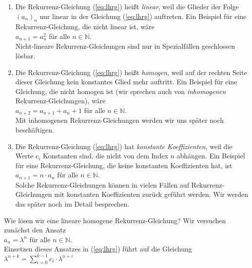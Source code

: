 \begin{enumerate}
\item Die Rekurrenz-Gleichung (\ref{eq:lhrg}) heißt \emph{linear}, weil die Glieder der Folge $(a_n)_n$ nur
      linear in der Gleichung (\ref{eq:lhrg}) auftreten.  Ein Beispiel für eine
      Rekurrenz-Gleichung, die nicht linear ist, wäre \\[0.2cm]
      \hspace*{1.3cm} $a_{n+1} = a_n^2$ \quad für alle $n \in \mathbb{N}$. \\[0.2cm]
      Nicht-lineare Rekurrenz-Gleichungen sind nur in Spezialfällen geschlossen lösbar.
\item Die Rekurrenz-Gleichung (\ref{eq:lhrg}) heißt \emph{homogen}, weil auf der rechten Seite
      dieser Gleichung kein konstantes Glied mehr auftritt.  Ein Beispiel für eine
      Gleichung, die nicht homogen ist (wir sprechen auch von \emph{inhomogenen}
      Rekurrenz-Gleichungen), wäre \\[0.2cm]
      \hspace*{1.3cm} $a_{n+2} = a_{n+1} + a_n + 1$ \quad für alle $n \in \mathbb{N}$. \\[0.2cm]
      Mit inhomogenen Rekurrenz-Gleichungen werden wir uns später noch beschäftigen.
\item Die Rekurrenz-Gleichung (\ref{eq:lhrg}) hat \emph{konstante Koeffizienten}, weil die
      Werte $c_i$ Konstanten sind, die nicht von dem Index $n$ abhängen.  Ein Beispiel für
      eine Rekurrenz-Gleichung, die keine konstanten Koeffizienten hat, ist \\[0.2cm]
      \hspace*{1.3cm} $a_{n+1} = n\cdot a_n$ \quad für alle $n \in \mathbb{N}$. \\[0.2cm]
      Solche Rekurrenz-Gleichungen können in vielen Fällen auf Rekurrenz-Gleichungen mit
      konstanten Koeffizienten zurück geführt werden.  Wir werden das später noch im
      Detail besprechen.
\end{enumerate}
Wie lösen wir eine lineare homogene Rekurrenz-Gleichung?  Wir versuchen zunächst den Ansatz\\[0.2cm]
\hspace*{1.3cm}  $a_n = \lambda^n$ \quad für alle $n \in \mathbb{N}$. \\[0.2cm]
Einsetzen dieses Ansatzes in (\ref{eq:lhrg}) führt auf die Gleichung \\[0.2cm]
\hspace*{1.3cm}
$\lambda^{n+k} = \sum\limits_{i=0}^{k-1} c_i \cdot \lambda^{n+i}$
